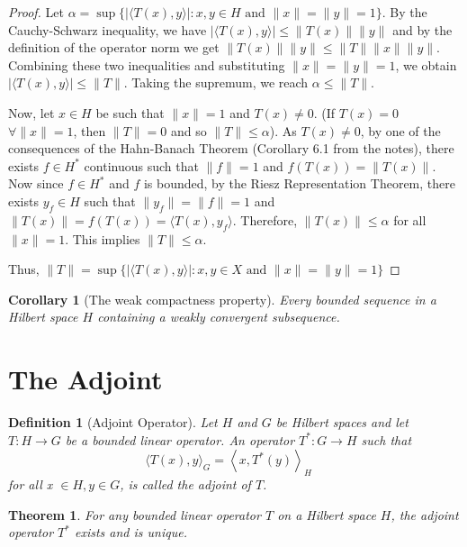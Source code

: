 \documentclass{report}
\newtheorem{thm}{Theorem}
\newtheorem{defn}{Definition}
\newtheorem{cor}{Corollary}
\begin{document}
\begin{proof}
Let $\alpha = \sup \{ | \langle T(x), y \rangle | : x, y \in H \text{ and } \|x\| = \|y\| = 1 \}$.
By the Cauchy-Schwarz inequality, we have $| \langle T(x), y \rangle | \leq \|T(x)\| \|y\|$ and by the definition of the operator norm we get $ \|T(x)\| \|y\| \leq \|T\| \|x\| \|y\|$. Combining these two inequalities and substituting $\|x\| = \|y\| = 1$, we obtain $| \langle T(x), y \rangle | \leq \|T\|$. Taking the supremum, we reach $\alpha \leq \|T\| $.

Now, let $x \in H$ be such that $\|x\| = 1$ and $T(x) \neq 0$. (If $T(x) = 0$ $\forall \|x\| = 1$, then $\|T\|  = 0$ and so $\|T\| \leq \alpha$). As $T(x) \neq 0$, by one of the consequences of the Hahn-Banach Theorem (Corollary 6.1 from the notes), there exists $f \in H^*$ continuous such that $\|f\| = 1$ and $f(T(x)) = \|T(x)\|$. Now since $f \in H^{*}$ and $f$ is bounded, by the Riesz Representation Theorem, there exists $y_f \in H$ such that $\|y_f\| = \|f\| = 1$ and $\|T(x)\| = f(T(x)) = \langle T(x), y_f \rangle$. Therefore, $\|T(x)\| \leq \alpha$ for all $\|x\| = 1$. This implies $\|T\| \leq \alpha$.

Thus, $\|T\|  = \sup \{ | \langle T(x), y \rangle | : x, y \in X \text{ and } \|x\| = \|y\| = 1 \}$
\end{proof}


\begin{cor}[The weak compactness property]
Every bounded sequence in a Hilbert space $H$ containing a weakly convergent subsequence.
\end{cor}


\section{The Adjoint}

\begin{defn}[Adjoint Operator]
  Let $H$ and $G$ be Hilbert spaces and let $T: H \longrightarrow G$ be a bounded linear operator. An operator $T^{*}: G \rightarrow H$ such that
\begin{equation}
\langle T(x), y\rangle_{G}=\left\langle x, T^{*}(y)\right\rangle_{H} \quad
\end{equation}
 for all  x $\in H, y \in G$, is called the adjoint of $T$.\label{eq:adjoint}
\end{defn}

\begin{thm}
For any bounded linear operator $T$ on a Hilbert space $H$, the adjoint operator $T^{*}$ exists and is unique.
\end{thm}
\end{document}
